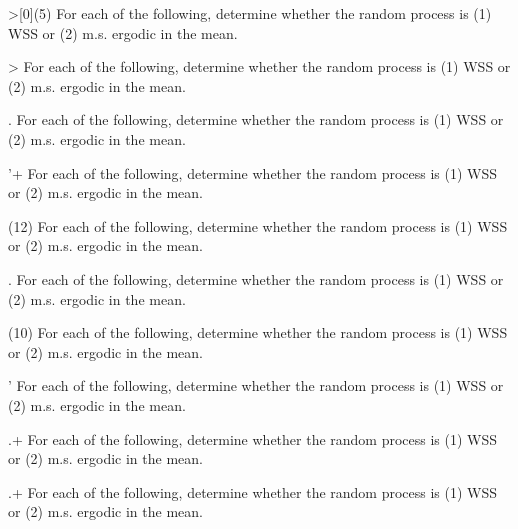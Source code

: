 \begin{problem}>[0](5)
    For each of the following, determine whether the random process is (1) WSS or (2) m.s. ergodic in the mean.
\end{problem}
\begin{problem}>
    For each of the following, determine whether the random process is (1) WSS or (2) m.s. ergodic in the mean.
\end{problem}
\begin{problem}.
    For each of the following, determine whether the random process is (1) WSS or (2) m.s. ergodic in the mean.
\end{problem}
\begin{problem}'+
    For each of the following, determine whether the random process is (1) WSS or (2) m.s. ergodic in the mean.
\end{problem}
\begin{problem}[3](12)
    For each of the following, determine whether the random process is (1) WSS or (2) m.s. ergodic in the mean.
\end{problem}
\begin{problem}.
    For each of the following, determine whether the random process is (1) WSS or (2) m.s. ergodic in the mean.
\end{problem}
\begin{problem}(10)
    For each of the following, determine whether the random process is (1) WSS or (2) m.s. ergodic in the mean.
\end{problem}
\begin{problem}'
    For each of the following, determine whether the random process is (1) WSS or (2) m.s. ergodic in the mean.
\end{problem}
\begin{problem}.+
    For each of the following, determine whether the random process is (1) WSS or (2) m.s. ergodic in the mean.
\end{problem}
\begin{problem}.+
    For each of the following, determine whether the random process is (1) WSS or (2) m.s. ergodic in the mean.
\end{problem}
